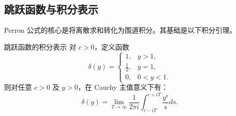 \subsection{跳跃函数与积分表示}

Perron 公式的核心是将离散求和转化为围道积分。其基础是以下积分引理。

\begin{lemma}{跳跃函数的积分表示}{}
对 $c > 0$，定义函数
\[
\delta(y) = 
\begin{cases}
1, & y > 1, \\
\frac{1}{2}, & y = 1, \\
0, & 0 < y < 1.
\end{cases}
\]
则对任意 $c > 0$ 及 $y > 0$，在 Cauchy 主值意义下有：
\begin{equation}
\delta(y) = \lim_{T\to\infty} \frac{1}{2\pi i} \int_{c-iT}^{c+iT} \frac{y^s}{s} ds.
\label{eq:delta_integral}
\end{equation}
\end{lemma}

